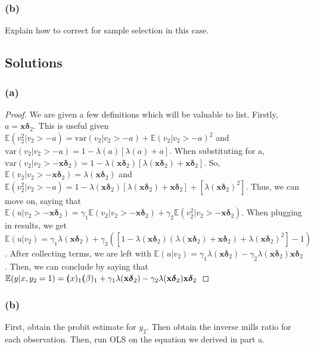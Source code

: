 \documentclass[10pt, a4paper]{article}
\newcommand{\EE}{\mathbb E}
\newcommand{\var}{\text{var}}
\begin{document}
    \subsubsection*{(b)}
      Explain how to correct for sample selection in this case.
  \subsection*{Solutions}
    \subsubsection*{(a)}
      \begin{proof}
        We are given a few definitions which will be valuable to list. Firstly, $a = \textbf{x}\boldsymbol{\delta}_2$. This is useful given $\EE(v_2^2|v_2>-a) = \var(v_2|v_2>-a) + \EE(v_2|v_2>-a)^2$ and $\var(v_2|v_2>-a) = 1-\lambda(a)[\lambda(a)+a]$. When substituting for a, $\var(v_2|v_2>-\textbf{x}\boldsymbol{\delta}_2) = 1 - \lambda(\textbf{x}\boldsymbol{\delta}_2)[\lambda(\textbf{x}\boldsymbol{\delta}_2)+\textbf{x}\boldsymbol{\delta}_2]$. So, $\EE(v_2|v_2>-\textbf{x}\boldsymbol{\delta}_2) = \lambda(\textbf{x}\boldsymbol{\delta}_2)$ and $\EE(v_2^2|v_2>-a) = 1 - \lambda(\textbf{x}\boldsymbol{\delta}_2)[\lambda(\textbf{x}\boldsymbol{\delta}_2)+\textbf{x}\boldsymbol{\delta}_2] + [\lambda(\textbf{x}\boldsymbol{\delta}_2)^2]$. Thus, we can move on, saying that $\EE(u|v_2>-\textbf{x}\boldsymbol{\delta}_2) = \gamma_1\EE(v_2|v_2>-\textbf{x}\boldsymbol{\delta}_2) + \gamma_2\EE(v_2^2|v_2>-\textbf{x}\boldsymbol{\delta}_2)$. When plugging in results, we get $\EE(u|v_2) = \gamma_1\lambda(\textbf{x}\boldsymbol{\delta}_2) + \gamma_2([1-\lambda(\textbf{x}\boldsymbol{\delta}_2)(\lambda(\textbf{x}\boldsymbol{\delta}_2)+\textbf{x}\boldsymbol{\delta}_2)+\lambda(\textbf{x}\boldsymbol{\delta}_2)^2]-1)$. After collecting terms, we are left with $\EE(u|v_2) = \gamma_1\lambda(\textbf{x}\boldsymbol{\delta}_2) - \gamma_2\lambda(\textbf{x}\boldsymbol{\delta}_2)\textbf{x}\boldsymbol{\delta}_2$. Then, we can conclude by saying that $\EE(y|x,y_2=1) = \textbf(x)_1\boldsymbol(\beta)_1 + \gamma_1\lambda(\textbf{x}\boldsymbol{\delta}_2) - \gamma_2\lambda(\textbf{x}\boldsymbol{\delta}_2)\textbf{x}\boldsymbol{\delta}_2$
      \end{proof}
    \subsubsection*{(b)}
      First, obtain the probit estimate for $y_2$. Then obtain the inverse mills ratio for each observation. Then, run OLS on the equation we derived in part a.
\end{document}
